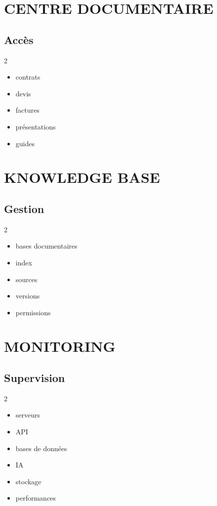\documentclass[12pt,a4paper,oneside]{book}
\begin{document}
\chapter{CENTRE DOCUMENTAIRE}

\section{Accès}
\begin{multicols}{2}
\begin{itemize}
\item contrats
\item devis
\item factures
\item présentations
\item guides
\end{itemize}
\end{multicols}

\chapter{KNOWLEDGE BASE}

\section{Gestion}
\begin{multicols}{2}
\begin{itemize}
\item bases documentaires
\item index
\item sources
\item versions
\item permissions
\end{itemize}
\end{multicols}

\chapter{MONITORING}

\section{Supervision}
\begin{multicols}{2}
\begin{itemize}
\item serveurs
\item API
\item bases de données
\item IA
\item stockage
\item performances
\end{itemize}
\end{multicols}
\end{document}
